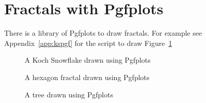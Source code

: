 
\newpage
\clearpage
\section{Fractals with Pgfplots}
There is a library of Pgfplots to draw fractals.
For example see Appendix~\ref{app:kspgf} for the script
to draw Figure~\ref{fig:KSPgf}


\begin{figure}[ht!]
\centering
{}
\caption{
A Koch Snowflake drawn using Pgfplots}
\label{fig:KSPgf}
\end{figure}

\textcolor{gray}{
\lipsum[2][3-5]
}

\begin{figure}[ht!]
\centering
{}
\caption{
A hexagon fractal drawn using Pgfplots}
\label{fig:hexa}
\end{figure}

\textcolor{gray}{
\lipsum[2][1-2]
}

\begin{figure}[ht!]
\centering
{}
\caption{
A tree drawn using Pgfplots}
\label{fig:tree}
\end{figure}

\textcolor{gray}{
\lipsum[2-3]
}

